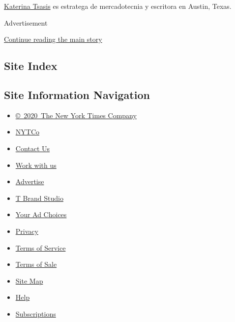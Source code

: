 \href{https://www.kt.marketing/}{Katerina Tsasis} es estratega de
mercadotecnia y escritora en Austin, Texas.

Advertisement

\protect\hyperlink{after-bottom}{Continue reading the main story}

\hypertarget{site-index}{%
\subsection{Site Index}\label{site-index}}

\hypertarget{site-information-navigation}{%
\subsection{Site Information
Navigation}\label{site-information-navigation}}

\begin{itemize}
\tightlist
\item
  \href{https://help.nytimes3xbfgragh.onion/hc/en-us/articles/115014792127-Copyright-notice}{©~2020~The
  New York Times Company}
\end{itemize}

\begin{itemize}
\tightlist
\item
  \href{https://www.nytco.com/}{NYTCo}
\item
  \href{https://help.nytimes3xbfgragh.onion/hc/en-us/articles/115015385887-Contact-Us}{Contact
  Us}
\item
  \href{https://www.nytco.com/careers/}{Work with us}
\item
  \href{https://nytmediakit.com/}{Advertise}
\item
  \href{http://www.tbrandstudio.com/}{T Brand Studio}
\item
  \href{https://www.nytimes3xbfgragh.onion/privacy/cookie-policy\#how-do-i-manage-trackers}{Your
  Ad Choices}
\item
  \href{https://www.nytimes3xbfgragh.onion/privacy}{Privacy}
\item
  \href{https://help.nytimes3xbfgragh.onion/hc/en-us/articles/115014893428-Terms-of-service}{Terms
  of Service}
\item
  \href{https://help.nytimes3xbfgragh.onion/hc/en-us/articles/115014893968-Terms-of-sale}{Terms
  of Sale}
\item
  \href{https://spiderbites.nytimes3xbfgragh.onion}{Site Map}
\item
  \href{https://help.nytimes3xbfgragh.onion/hc/en-us}{Help}
\item
  \href{https://www.nytimes3xbfgragh.onion/subscription?campaignId=37WXW}{Subscriptions}
\end{itemize}
